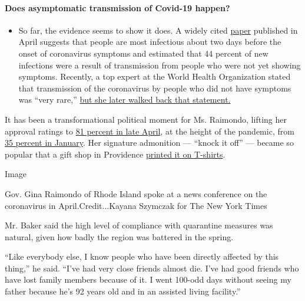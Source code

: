 \begin{itemize}
{  \paragraph{Does asymptomatic transmission of Covid-19
  happen?}\label{does-asymptomatic-transmission-of-covid-19-happen}}

  \begin{itemize}
  \tightlist
  \item
    So far, the evidence seems to show it does. A widely cited
    \href{https://www.nature.com/articles/s41591-020-0869-5}{paper}
    published in April suggests that people are most infectious about
    two days before the onset of coronavirus symptoms and estimated that
    44 percent of new infections were a result of transmission from
    people who were not yet showing symptoms. Recently, a top expert at
    the World Health Organization stated that transmission of the
    coronavirus by people who did not have symptoms was ``very rare,''
    \href{https://www.nytimes.com/2020/06/09/world/coronavirus-updates.html?action=click\&pgtype=Article\&state=default\&region=MAIN_CONTENT_3\&context=storylines_faq\#link-1f302e21}{but
    she later walked back that statement.}
  \end{itemize}
\end{itemize}

It has been a transformational political moment for Ms. Raimondo,
lifting her approval ratings to
\href{https://www.wpri.com/news/politics/poll-81-in-ri-back-gov-raimondos-handling-of-coronavirus-crisis/}{81
percent in late April}, at the height of the pandemic, from
\href{https://www.bostonglobe.com/2020/01/17/metro/poll-raimondo-is-no-longer-most-unpopular-governor-us/?s_campaign=rhodemap:newsletter}{35
percent in January}. Her signature admonition --- ``knock it off'' ---
became so popular that a gift shop in Providence
\href{https://www.bostonglobe.com/2020/03/30/metro/ri-shop-selling-t-shirts-with-raimondos-message-social-distancing-scofflaws-knock-it-off/}{printed
it on T-shirts}.

Image

Gov. Gina Raimondo of Rhode Island spoke at a news conference on the
coronavirus in April.Credit...Kayana Szymczak for The New York Times

Mr. Baker said the high level of compliance with quarantine measures was
natural, given how badly the region was battered in the spring.

``Like everybody else, I know people who have been directly affected by
this thing,'' he said. ``I've had very close friends almost die. I've
had good friends who have lost family members because of it. I went
100-odd days without seeing my father because he's 92 years old and in
an assisted living facility.''

